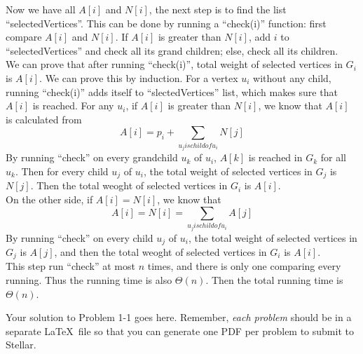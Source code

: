\documentclass{6046}
\begin{document}
Now we have all $A[i]$ and $N[i]$, the next step is to find the list ``selectedVertices''. 
This can be done by running a ``check(i)'' function: 
first compare $A[i]$ and $N[i]$. 
If $A[i]$ is greater than $N[i]$, add $i$ to ``selectedVertices'' and check all its grand children; 
else, check all its children. 
\\
We can prove that after running ``check(i)'', 
total weight of selected vertices in $G_i$ is $A[i]$.
We can prove this by induction. 
For a vertex $u_i$ without any child, running ``check(i)'' 
adds itself to ``slectedVertices'' list, which makes sure that $A[i]$ is reached. 
For any $u_i$, if $A[i]$ is greater than $N[i]$, 
we know that $A[i]$ is calculated from 
$$A[i] = p_i + \sum_{u_j is child of u_i}N[j]$$
By running ``check'' on every grandchild $u_k$ of $u_i$, 
$A[k]$ is reached in $G_k$ for all $u_k$. 
Then for every child $u_j$ of $u_i$, the total weight of selected vertices in $G_j$ is 
$N[j]$. 
Then the total weoght of selected vertices in $G_i$ is $A[i]$. 
\\
On the other side, if $A[i] = N[i]$, 
we know that 
$$A[i] = N[i] = \sum_{u_j is child of u_i} A[j]$$
By running ``check'' on every child $u_j$ of $u_i$, 
the total weight of selected vertices in $G_j$ is $A[j]$, and 
then the total weoght of selected vertices in $G_i$ is $A[i]$. 
\\
This step run ``check'' at most $n$ times, and there is only one comparing every running. 
Thus the running time is also $\Theta(n)$. 
Then the total running time is $\Theta(n)$. 

Your solution to Problem 1-1 goes here. Remember, \emph{each problem} should be
in a separate \LaTeX\ file so that you can generate one PDF per problem to
submit to Stellar.
\end{document}

